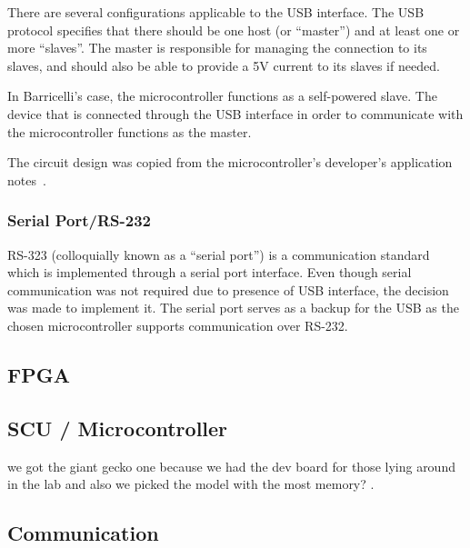 There are several configurations applicable to the USB interface.
The USB protocol specifies that there should be one host (or ``master'') and at least one or more ``slaves''.
The master is responsible for managing the connection to its slaves, and should also be able to provide a 5V current to its slaves if needed.

In Barricelli's case, the microcontroller functions as a self-powered slave.
The device that is connected through the USB interface in order to communicate with the microcontroller functions as the master.

The circuit design was copied from the microcontroller's developer's application notes~\cite[Figure 2.2]{an0046}.


\subsubsection{Serial Port/RS-232} 
RS-323 (colloquially known as a ``serial port'') is a communication standard which is implemented through a serial port interface.
Even though serial communication was not required due to presence of USB interface, the decision was made to implement it.
The serial port serves as a backup for the USB as the chosen microcontroller supports communication over RS-232.

\subsection{FPGA} \label{pcb:design-choices:ss:fpga}


\subsection{SCU / Microcontroller} \label{pcb:design-choices:ss:scu}
we got the giant gecko one because we had the dev board for those lying around in the lab and also we picked the model with the most memory? .


\subsection{Communication} \label{pcb:design-choices:ss:internal_communication}

